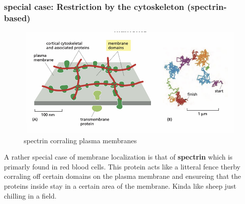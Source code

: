 \documentclass[../main.tex]{subfiles}
\begin{document}
\subsubsection{special case: Restriction by the cytoskeleton (spectrin- based)}

\begin{figure}[H]
    \centering
    \includegraphics[width=\linewidth]{spectrin.png}
    \caption{\gls{spectrin} corraling plasma membranes}
    \label{fig:enter-label}
\end{figure}

A rather special case of membrane localization is that of\textbf{ spectrin} which is primarly found in red blood cells. This protein acts like a litteral fence therby corraling off certain domains on the plasma membrane and ensureing that the proteins inside stay in a certain area of the membrane. Kinda like sheep just chilling in a field.

\printglossaries
\end{document}
